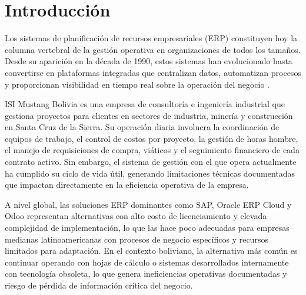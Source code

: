 \documentclass{univalle-perfil}
\begin{document}
\makecaratula

\tableofcontents
\listoffigures


\section{Introducción}

Los sistemas de planificación de recursos empresariales (ERP) constituyen hoy la columna vertebral de la gestión operativa en organizaciones de todos los tamaños. Desde su aparición en la década de 1990, estos sistemas han evolucionado hasta convertirse en plataformas integradas que centralizan datos, automatizan procesos y proporcionan visibilidad en tiempo real sobre la operación del negocio \parencite{monk2012}.

ISI Mustang Bolivia es una empresa de consultoría e ingeniería industrial que gestiona proyectos para clientes en sectores de industria, minería y construcción en Santa Cruz de la Sierra. Su operación diaria involucra la coordinación de equipos de trabajo, el control de costos por proyecto, la gestión de horas hombre, el manejo de requisiciones de compra, viáticos y el seguimiento financiero de cada contrato activo. Sin embargo, el sistema de gestión con el que opera actualmente ha cumplido su ciclo de vida útil, generando limitaciones técnicas documentadas que impactan directamente en la eficiencia operativa de la empresa.

A nivel global, las soluciones ERP dominantes como SAP, Oracle ERP Cloud y Odoo representan alternativas con alto costo de licenciamiento y elevada complejidad de implementación, lo que las hace poco adecuadas para empresas medianas latinoamericanas con procesos de negocio específicos y recursos limitados para adaptación. En el contexto boliviano, la alternativa más común es continuar operando con hojas de cálculo o sistemas desarrollados internamente con tecnología obsoleta, lo que genera ineficiencias operativas documentadas y riesgo de pérdida de información crítica del negocio.
\end{document}
